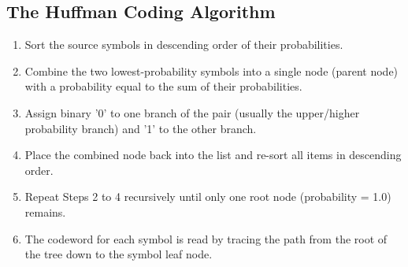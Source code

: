 \documentclass[12pt,a4paper]{article}
\begin{document}
\subsection{The Huffman Coding Algorithm}
\begin{enumerate}[label=\textbf{Step \arabic*:}, leftmargin=4.5em, itemsep=3.5pt]
  \item Sort the source symbols in descending order of their probabilities.
  \item Combine the two lowest-probability symbols into a single node (parent node) with a probability equal to the sum of their probabilities.
  \item Assign binary '0' to one branch of the pair (usually the upper/higher probability branch) and '1' to the other branch.
  \item Place the combined node back into the list and re-sort all items in descending order.
  \item Repeat Steps 2 to 4 recursively until only one root node (probability = 1.0) remains.
  \item The codeword for each symbol is read by tracing the path from the root of the tree down to the symbol leaf node.
\end{enumerate}
\end{document}
